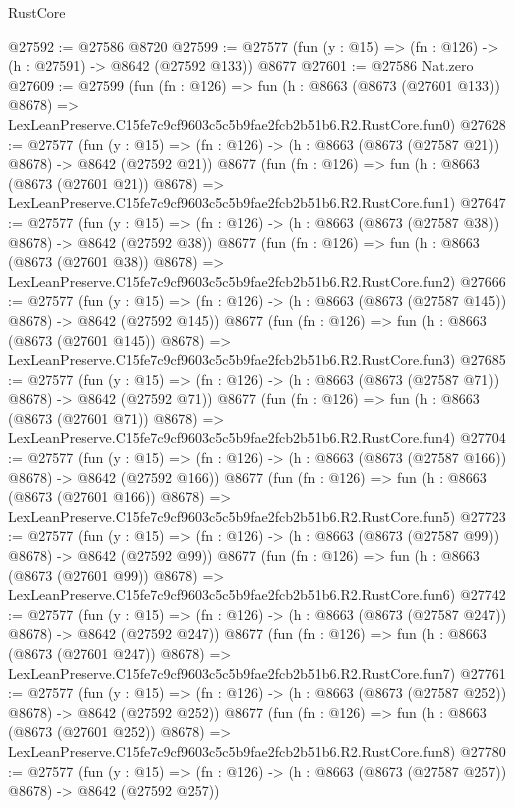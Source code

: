 \begin{lexlean}{RustCore}
\begin{coremodule}
@27592 := @27586 @8720
@27599 := @27577 (fun (y : @15) => (fn : @126) -> (h : @27591) -> @8642 (@27592 @133)) @8677
@27601 := @27586 Nat.zero
@27609 := @27599
    (fun (fn : @126) =>
    fun (h : @8663 (@8673 (@27601 @133)) @8678) =>
    LexLeanPreserve.C15fe7c9cf9603c5c5b9fae2fcb2b51b6.R2.RustCore.fun0)
@27628 := @27577
    (fun (y : @15) => (fn : @126) -> (h : @8663 (@8673 (@27587 @21)) @8678) -> @8642 (@27592 @21))
    @8677
    (fun (fn : @126) =>
    fun (h : @8663 (@8673 (@27601 @21)) @8678) =>
    LexLeanPreserve.C15fe7c9cf9603c5c5b9fae2fcb2b51b6.R2.RustCore.fun1)
@27647 := @27577
    (fun (y : @15) => (fn : @126) -> (h : @8663 (@8673 (@27587 @38)) @8678) -> @8642 (@27592 @38))
    @8677
    (fun (fn : @126) =>
    fun (h : @8663 (@8673 (@27601 @38)) @8678) =>
    LexLeanPreserve.C15fe7c9cf9603c5c5b9fae2fcb2b51b6.R2.RustCore.fun2)
@27666 := @27577
    (fun (y : @15) => (fn : @126) -> (h : @8663 (@8673 (@27587 @145)) @8678) -> @8642 (@27592 @145))
    @8677
    (fun (fn : @126) =>
    fun (h : @8663 (@8673 (@27601 @145)) @8678) =>
    LexLeanPreserve.C15fe7c9cf9603c5c5b9fae2fcb2b51b6.R2.RustCore.fun3)
@27685 := @27577
    (fun (y : @15) => (fn : @126) -> (h : @8663 (@8673 (@27587 @71)) @8678) -> @8642 (@27592 @71))
    @8677
    (fun (fn : @126) =>
    fun (h : @8663 (@8673 (@27601 @71)) @8678) =>
    LexLeanPreserve.C15fe7c9cf9603c5c5b9fae2fcb2b51b6.R2.RustCore.fun4)
@27704 := @27577
    (fun (y : @15) => (fn : @126) -> (h : @8663 (@8673 (@27587 @166)) @8678) -> @8642 (@27592 @166))
    @8677
    (fun (fn : @126) =>
    fun (h : @8663 (@8673 (@27601 @166)) @8678) =>
    LexLeanPreserve.C15fe7c9cf9603c5c5b9fae2fcb2b51b6.R2.RustCore.fun5)
@27723 := @27577
    (fun (y : @15) => (fn : @126) -> (h : @8663 (@8673 (@27587 @99)) @8678) -> @8642 (@27592 @99))
    @8677
    (fun (fn : @126) =>
    fun (h : @8663 (@8673 (@27601 @99)) @8678) =>
    LexLeanPreserve.C15fe7c9cf9603c5c5b9fae2fcb2b51b6.R2.RustCore.fun6)
@27742 := @27577
    (fun (y : @15) => (fn : @126) -> (h : @8663 (@8673 (@27587 @247)) @8678) -> @8642 (@27592 @247))
    @8677
    (fun (fn : @126) =>
    fun (h : @8663 (@8673 (@27601 @247)) @8678) =>
    LexLeanPreserve.C15fe7c9cf9603c5c5b9fae2fcb2b51b6.R2.RustCore.fun7)
@27761 := @27577
    (fun (y : @15) => (fn : @126) -> (h : @8663 (@8673 (@27587 @252)) @8678) -> @8642 (@27592 @252))
    @8677
    (fun (fn : @126) =>
    fun (h : @8663 (@8673 (@27601 @252)) @8678) =>
    LexLeanPreserve.C15fe7c9cf9603c5c5b9fae2fcb2b51b6.R2.RustCore.fun8)
@27780 := @27577
    (fun (y : @15) => (fn : @126) -> (h : @8663 (@8673 (@27587 @257)) @8678) -> @8642 (@27592 @257))

\end{coremodule}
\end{lexlean}
